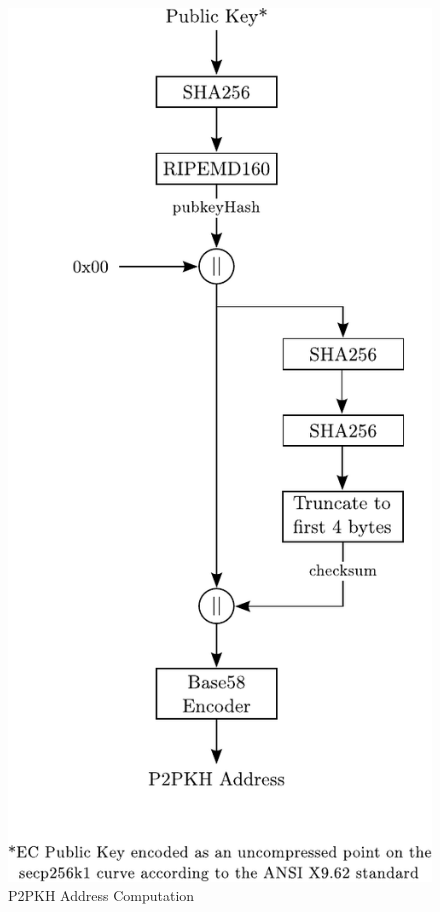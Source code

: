 \begin{figure}[htbp]

\centering
\includegraphics[scale=0.9]{Images/BitcoinAddress-P2PKH.pdf}

\vspace{10pt}
\caption{P2PKH Address Computation}
\label{fig:BitcoinAddress-P2PKH}
\end{figure}
\vspace{-10pt}


